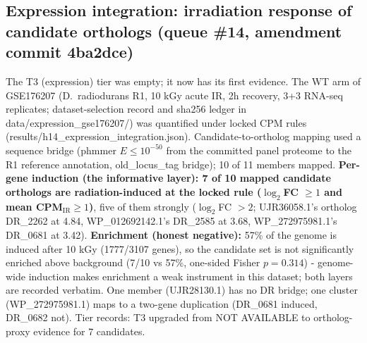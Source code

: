 \documentclass[12pt,a4paper]{article}
\begin{document}
\subsection{Expression integration: irradiation response of candidate orthologs (queue \#14, amendment commit 4ba2dce)}
The T3 (expression) tier was empty; it now has its first evidence. The WT arm of GSE176207 (D.\ radiodurans R1, 10 kGy acute IR, 2h recovery, 3+3 RNA-seq replicates; dataset-selection record and sha256 ledger in data/expression\_gse176207/) was quantified under locked CPM rules (results/h14\_expression\_integration.json). Candidate-to-ortholog mapping used a sequence bridge (phmmer $E \leq 10^{-50}$ from the committed panel proteome to the R1 reference annotation, old\_locus\_tag bridge); 10 of 11 members mapped. \textbf{Per-gene induction (the informative layer): 7 of 10 mapped candidate orthologs are radiation-induced at the locked rule ($\log_2$FC $\geq 1$ and mean CPM$_{\mathrm{IR}} \geq 1$)}, five of them strongly ($\log_2$FC $> 2$; UJR36058.1's ortholog DR\_2262 at 4.84, WP\_012692142.1's DR\_2585 at 3.68, WP\_272975981.1's DR\_0681 at 3.42). \textbf{Enrichment (honest negative):} 57\% of the genome is induced after 10 kGy (1777/3107 genes), so the candidate set is not significantly enriched above background (7/10 vs 57\%, one-sided Fisher $p=0.314$) - genome-wide induction makes enrichment a weak instrument in this dataset; both layers are recorded verbatim. One member (UJR28130.1) has no DR bridge; one cluster (WP\_272975981.1) maps to a two-gene duplication (DR\_0681 induced, DR\_0682 not). Tier records: T3 upgraded from NOT AVAILABLE to ortholog-proxy evidence for 7 candidates.
\end{document}
